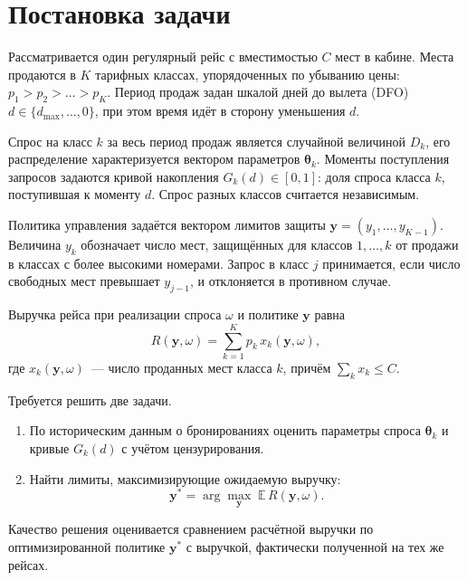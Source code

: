 \documentclass{misisarticle}
\begin{document}
\section{Постановка задачи}

Рассматривается один регулярный рейс с вместимостью $C$ мест в кабине. Места продаются в $K$ тарифных классах, упорядоченных по убыванию цены: $p_1 > p_2 > \dots > p_K$. Период продаж задан шкалой дней до вылета (DFO) $d \in \{d_{\max}, \dots, 0\}$, при этом время идёт в сторону уменьшения $d$.

Спрос на класс $k$ за весь период продаж является случайной величиной $D_k$, его распределение характеризуется вектором параметров $\boldsymbol{\theta}_k$. Моменты поступления запросов задаются кривой накопления $G_k(d) \in [0,1]$: доля спроса класса $k$, поступившая к моменту $d$. Спрос разных классов считается независимым.

Политика управления задаётся вектором лимитов защиты $\mathbf{y} = (y_1, \dots, y_{K-1})$. Величина $y_k$ обозначает число мест, защищённых для классов $1, \dots, k$ от продажи в классах с более высокими номерами. Запрос в класс $j$ принимается, если число свободных мест превышает $y_{j-1}$, и отклоняется в противном случае.

Выручка рейса при реализации спроса $\omega$ и политике $\mathbf{y}$ равна
\begin{equation}
  R(\mathbf{y}, \omega) = \sum_{k=1}^{K} p_k \, x_k(\mathbf{y}, \omega),
  \label{eq:revenue}
\end{equation}
где $x_k(\mathbf{y}, \omega)$~--- число проданных мест класса $k$, причём $\sum_k x_k \le C$.

Требуется решить две задачи.
\begin{enumerate}[label=\arabic*)]
  \item По историческим данным о бронированиях оценить параметры спроса $\boldsymbol{\theta}_k$ и кривые $G_k(d)$ с учётом цензурирования.
  \item Найти лимиты, максимизирующие ожидаемую выручку:
  \begin{equation}
    \mathbf{y}^{*} = \arg\max_{\mathbf{y}} \; \mathbb{E}\, R(\mathbf{y}, \omega).
    \label{eq:opt}
  \end{equation}
\end{enumerate}
Качество решения оценивается сравнением расчётной выручки по оптимизированной политике $\mathbf{y}^{*}$ с выручкой, фактически полученной на тех же рейсах.
\end{document}
